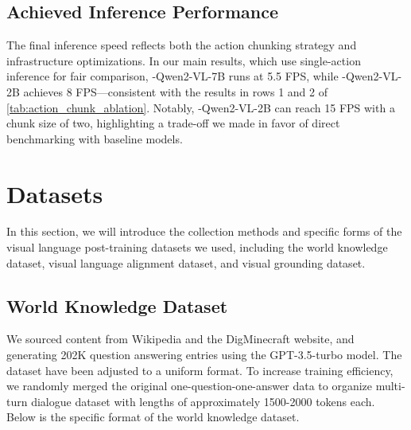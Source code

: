 \subsection*{Achieved Inference Performance}
The final inference speed reflects both the action chunking strategy and infrastructure optimizations. In our main results, which use single-action inference for fair comparison, \model-Qwen2-VL-7B runs at 5.5 FPS, while \model-Qwen2-VL-2B achieves 8 FPS—consistent with the results in rows 1 and 2 of \autoref{tab:action_chunk_ablation}. Notably, \model-Qwen2-VL-2B can reach 15 FPS with a chunk size of two, highlighting a trade-off we made in favor of direct benchmarking with baseline models.

\section{Datasets}\label{app:training_datasets}

In this section, we will introduce the collection methods and specific forms of the visual language post-training datasets we used, including the world knowledge dataset, visual language alignment dataset, and visual grounding dataset.


\subsection{World Knowledge Dataset}

We sourced content from Wikipedia and the DigMinecraft website, and generating 202K question answering entries using the GPT-3.5-turbo model. The dataset have been adjusted to a uniform format. To increase training efficiency, we randomly merged the original one-question-one-answer data to organize multi-turn dialogue dataset with lengths of approximately 1500-2000 tokens each. Below is the specific format of the world knowledge dataset.


